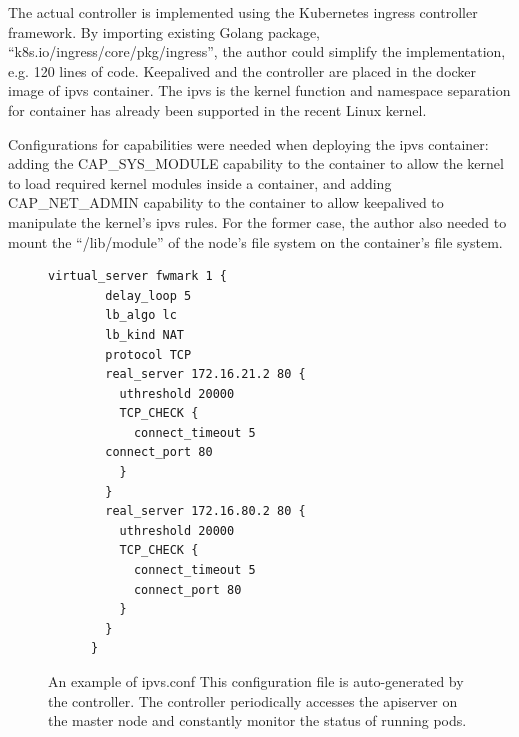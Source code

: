 The actual controller\cite{ktaka_ccmp_2017_826894} is implemented using the Kubernetes ingress controller\cite{K8sIngress2017} framework. 
By importing existing Golang package, \enquote{k8s.io/ingress/core/pkg/ingress}, the author could simplify the implementation, e.g. 
120 lines of code.  
%
Keepalived and the controller are placed in the docker image of ipvs container.
The ipvs is the kernel function and namespace separation for container has already been supported in the recent Linux kernel. 

Configurations for capabilities were needed when deploying the ipvs container: adding the CAP\_SYS\_MODULE capability 
to the container to allow the kernel to load required kernel modules inside a container, 
and adding CAP\_NET\_ADMIN capability to the container to allow keepalived to manipulate the kernel's ipvs rules. 
For the former case, the author also needed to mount the \enquote{/lib/module} of the node's file system on the container's file system.

\begin{figure}[h]
  \centering
  \begin{minipage}{0.7\columnwidth}
    \begin{lstlisting}[frame=single]
      virtual_server fwmark 1 {
        delay_loop 5
        lb_algo lc
        lb_kind NAT
        protocol TCP
        real_server 172.16.21.2 80 {
          uthreshold 20000
          TCP_CHECK {
            connect_timeout 5
        connect_port 80
          }
        }
        real_server 172.16.80.2 80 {
          uthreshold 20000
          TCP_CHECK {
            connect_timeout 5
            connect_port 80
          }
        }
      }
    \end{lstlisting}
  \end{minipage}

  \par\bigskip
    \centering
    \begin{minipage}{0.9\columnwidth}
      \caption[An example of ipvs.conf]{
        An example of ipvs.conf
        This configuration file is auto-generated by the controller.
        The controller periodically accesses the apiserver on the master node and constantly monitor the status of running pods.
      }
      \label{fig:ipvs.conf}
    \end{minipage}
\end{figure}

